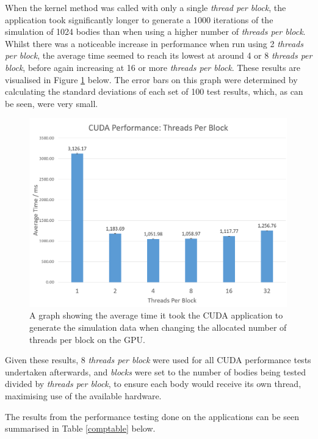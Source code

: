 \documentclass[12pt,journal,transmag]{IEEEtran}
\begin{document}
	When the kernel method was called with only a single \textit{thread per block}, the application took significantly longer to generate a 1000 iterations of the simulation of 1024 bodies than when using a higher number of  \textit{threads per block}. Whilst there was a noticeable increase in performance when run using 2 \textit{threads per block}, the average time seemed to reach its lowest at around 4 or 8 \textit{threads per block}, before again increasing at 16 or more \textit{threads per block}. These results are visualised in Figure \ref{graph1} below. The error bars on this graph were determined by calculating the standard deviations of each set of 100 test results, which, as can be seen, were very small.

	\begin{figure}[!h]
		\centering
		\includegraphics[width=1.5\columnwidth]{IMAGES/cudathreads}
		\caption{A graph showing the average time it took the CUDA application to generate the simulation data when changing the allocated number of threads per block on the GPU.}
		\label{graph1}
	\end{figure}

	Given these results, 8 \textit{threads per block} were used for all CUDA performance tests undertaken afterwards, and \textit{blocks} were set to the number of bodies being tested divided by \textit{threads per block}, to ensure each body would receive its own thread, maximising use of the available hardware.
	
	The results from the performance testing done on the applications can be seen summarised in Table \ref{comptable} below. 
\end{document}
